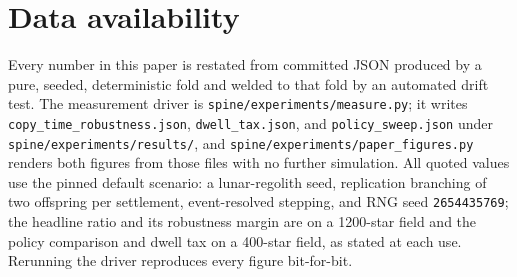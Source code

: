 \documentclass[11pt]{article}
\begin{document}
\section*{Data availability}
Every number in this paper is restated from committed JSON produced by a pure, seeded,
deterministic fold and welded to that fold by an automated drift test. The measurement
driver is \texttt{spine/experiments/measure.py}; it writes \texttt{copy\_time\_robustness.json},
\texttt{dwell\_tax.json}, and \texttt{policy\_sweep.json} under \texttt{spine/experiments/results/},
and \texttt{spine/experiments/paper\_figures.py} renders both figures from those files with no
further simulation. All quoted values use the pinned default scenario: a lunar-regolith seed,
replication branching of two offspring per settlement, event-resolved stepping, and RNG seed
\texttt{2654435769}; the headline ratio and its robustness margin are on a 1200-star field and
the policy comparison and dwell tax on a 400-star field, as stated at each use. Rerunning the
driver reproduces every figure bit-for-bit.


\end{document}
